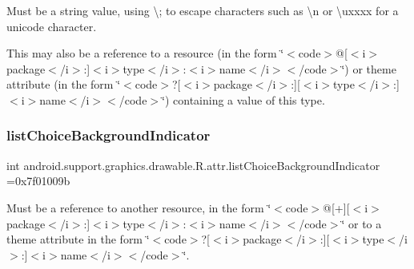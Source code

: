Must be a string value, using \textquotesingle{}\textbackslash{};\textquotesingle{} to escape characters such as \textquotesingle{}\textbackslash{}n\textquotesingle{} or \textquotesingle{}\textbackslash{}uxxxx\textquotesingle{} for a unicode character. 

This may also be a reference to a resource (in the form \char`\"{}$<$code$>$@\mbox{[}$<$i$>$package$<$/i$>$\+:\mbox{]}$<$i$>$type$<$/i$>$\+:$<$i$>$name$<$/i$>$$<$/code$>$\char`\"{}) or theme attribute (in the form \char`\"{}$<$code$>$?\mbox{[}$<$i$>$package$<$/i$>$\+:\mbox{]}\mbox{[}$<$i$>$type$<$/i$>$\+:\mbox{]}$<$i$>$name$<$/i$>$$<$/code$>$\char`\"{}) containing a value of this type. \mbox{\label{classandroid_1_1support_1_1graphics_1_1drawable_1_1R_1_1attr_a91d0d99c123a306e3e752f91e9db2993}} 
\subsubsection{\texorpdfstring{list\+Choice\+Background\+Indicator}{listChoiceBackgroundIndicator}}
{\footnotesize\ttfamily int android.\+support.\+graphics.\+drawable.\+R.\+attr.\+list\+Choice\+Background\+Indicator =0x7f01009b\hspace{0.3cm}{\ttfamily [static]}}

Must be a reference to another resource, in the form \char`\"{}$<$code$>$@\mbox{[}+\mbox{]}\mbox{[}$<$i$>$package$<$/i$>$\+:\mbox{]}$<$i$>$type$<$/i$>$\+:$<$i$>$name$<$/i$>$$<$/code$>$\char`\"{} or to a theme attribute in the form \char`\"{}$<$code$>$?\mbox{[}$<$i$>$package$<$/i$>$\+:\mbox{]}\mbox{[}$<$i$>$type$<$/i$>$\+:\mbox{]}$<$i$>$name$<$/i$>$$<$/code$>$\char`\"{}. \mbox{\label{classandroid_1_1support_1_1graphics_1_1drawable_1_1R_1_1attr_a4b5797b34a74f031954741f47d631794}} 
